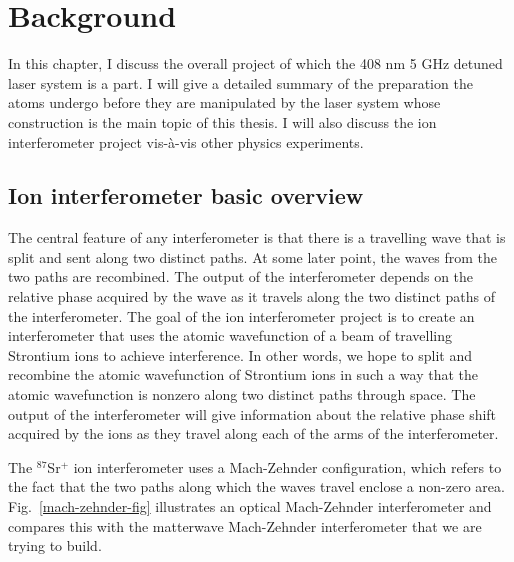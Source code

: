 
\chapter{Background}
In this chapter, I discuss the overall project of which the 408 nm 5 GHz detuned laser system is a part. I will give a detailed summary of the preparation the atoms undergo before they are manipulated by the laser system whose construction is the main topic of this thesis. I will also discuss the ion interferometer project vis-\`a-vis other physics experiments.

\section{Ion interferometer basic overview}
The central feature of any interferometer is that there is a travelling wave that is split and sent along two distinct paths. At some later point, the waves from the two paths are recombined. The output of the interferometer depends on the relative phase acquired by the wave as it travels along the two distinct paths of the interferometer.
The goal of the ion interferometer project is to create an interferometer that uses the atomic wavefunction of a beam of travelling Strontium ions to achieve interference.
In other words, we hope to split and recombine the atomic wavefunction of Strontium ions in such a way that the atomic wavefunction is nonzero along two distinct paths through space. 
The output of the interferometer will give information about the relative phase shift acquired by the ions as they travel along each of the arms of the interferometer. 

The $^{87}$Sr$^+$ ion interferometer uses a Mach-Zehnder configuration, which refers to the fact that the two paths along which the waves travel enclose a non-zero area. Fig.\ \ref{mach-zehnder-fig} illustrates an optical Mach-Zehnder interferometer and compares this with the matterwave Mach-Zehnder interferometer that we are trying to build.

